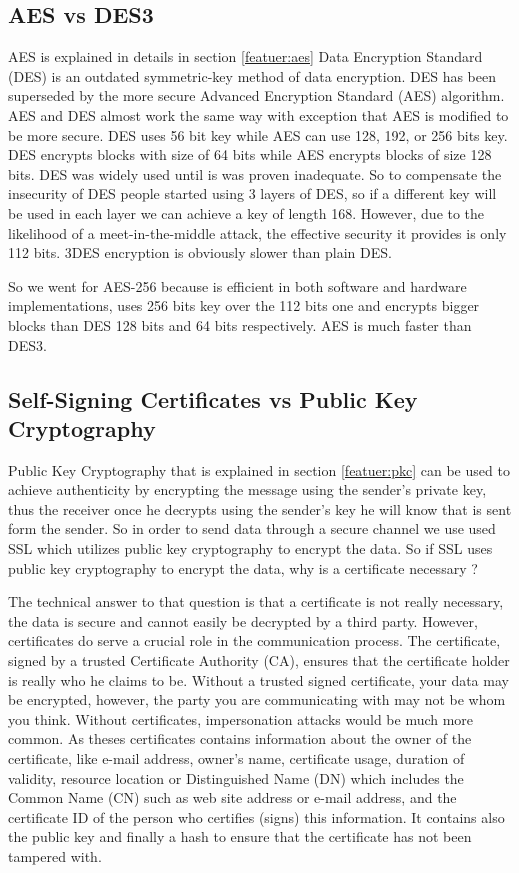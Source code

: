 \subsection{AES vs DES3}
AES is explained in details in section \ref{featuer:aes}
Data Encryption Standard (DES) is an outdated symmetric-key method of data encryption. DES has been superseded by the more secure Advanced Encryption Standard (AES) algorithm. AES and DES almost work the same way with exception that AES is modified to be more secure. DES uses 56 bit key while AES can use 128, 192, or 256 bits key. DES encrypts blocks with size of 64 bits while AES encrypts blocks of size 128 bits. DES was widely used until is was proven inadequate. So to compensate the insecurity of DES people started using 3 layers of DES, so if a different key will be used in each layer we can achieve a key of length 168. However, due to the likelihood of a meet-in-the-middle attack, the effective security it provides is only 112 bits. 3DES encryption is obviously slower than plain DES.
\par So we went for AES-256 because is efficient in both software and hardware implementations, uses 256 bits key over the 112 bits one and encrypts bigger blocks than DES 128 bits and 64 bits respectively. AES is much faster than DES3.

\subsection{Self-Signing Certificates vs Public Key Cryptography}
Public Key Cryptography that is explained in section \ref{featuer:pkc} can be used to achieve authenticity by encrypting the message using the sender's private key, thus the receiver once he decrypts using the sender's key he will know that is sent form the sender. So in order to send data through a secure channel we use used SSL which utilizes public key cryptography to encrypt the data. So if SSL uses public key cryptography to encrypt the data, why is a certificate necessary ?
\par The technical answer to that question is that a certificate is not really necessary, the data is secure and cannot easily be decrypted by a third party. However, certificates do serve a crucial role in the communication process. The certificate, signed by a trusted Certificate Authority (CA), ensures that the certificate holder is really who he claims to be. Without a trusted signed certificate, your data may be encrypted, however, the party you are communicating with may not be whom you think. Without certificates, impersonation attacks would be much more common. As theses certificates contains information about the owner of the certificate, like e-mail address, owner's name, certificate usage, duration of validity, resource location or Distinguished Name (DN) which includes the Common Name (CN) such as web site address or e-mail address, and the certificate ID of the person who certifies (signs) this information. It contains also the public key and finally a hash to ensure that the certificate has not been tampered with.